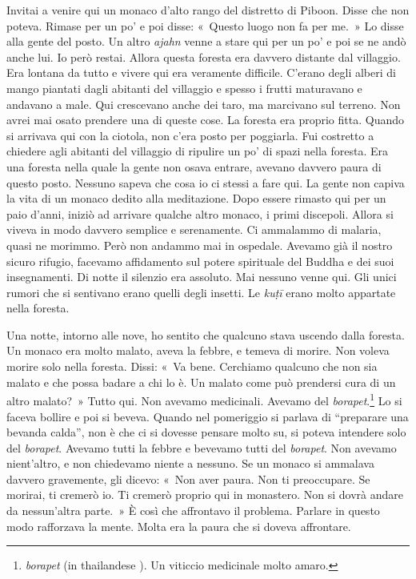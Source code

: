 Invitai a venire qui un monaco d'alto rango del distretto di Piboon.
Disse che non poteva. Rimase per un po' e poi disse: «~Questo luogo non
fa per me.~» Lo disse alla gente del posto. Un altro \emph{ajahn} venne
a stare qui per un po' e poi se ne andò anche lui. Io però restai.
Allora questa foresta era davvero distante dal villaggio. Era lontana da
tutto e vivere qui era veramente difficile. C'erano degli alberi di
mango piantati dagli abitanti del villaggio e spesso i frutti maturavano
e andavano a male. Qui crescevano anche dei taro, ma marcivano sul
terreno. Non avrei mai osato prendere una di queste cose. La foresta era
proprio fitta. Quando si arrivava qui con la ciotola, non c'era posto
per poggiarla. Fui costretto a chiedere agli abitanti del villaggio di
ripulire un po' di spazi nella foresta. Era una foresta nella quale la
gente non osava entrare, avevano davvero paura di questo posto. Nessuno
sapeva che cosa io ci stessi a fare qui. La gente non capiva la vita di
un monaco dedito alla meditazione. Dopo essere rimasto qui per un paio
d'anni, iniziò ad arrivare qualche altro monaco, i primi discepoli.
Allora si viveva in modo davvero semplice e serenamente. Ci ammalammo di
malaria, quasi ne morimmo. Però non andammo mai in ospedale. Avevamo già
il nostro sicuro rifugio, facevamo affidamento sul potere spirituale del
Buddha e dei suoi insegnamenti. Di notte il silenzio era assoluto. Mai
nessuno venne qui. Gli unici rumori che si sentivano erano quelli degli
insetti. Le \emph{kuṭī} erano molto appartate nella foresta.

Una notte, intorno alle nove, ho sentito che qualcuno stava uscendo
dalla foresta. Un monaco era molto malato, aveva la febbre, e temeva di
morire. Non voleva morire solo nella foresta. Dissi: «~Va bene.
Cerchiamo qualcuno che non sia malato e che possa badare a chi lo è. Un
malato come può prendersi cura di un altro malato?~» Tutto qui. Non
avevamo medicinali. Avevamo del \emph{borapet}.\footnote{\emph{borapet}
  (in thailandese ). Un viticcio medicinale molto amaro.} Lo si
faceva bollire e poi si beveva. Quando nel pomeriggio si parlava di
``preparare una bevanda calda'', non è che ci si dovesse pensare molto
su, si poteva intendere solo del \emph{borapet}. Avevamo tutti la febbre
e bevevamo tutti del \emph{borapet}. Non avevamo nient'altro, e non
chiedevamo niente a nessuno. Se un monaco si ammalava davvero
gravemente, gli dicevo: «~Non aver paura. Non ti preoccupare. Se
morirai, ti cremerò io. Ti cremerò proprio qui in monastero. Non si
dovrà andare da nessun'altra parte.~» È così che affrontavo il problema.
Parlare in questo modo rafforzava la mente. Molta era la paura che si
doveva affrontare.

